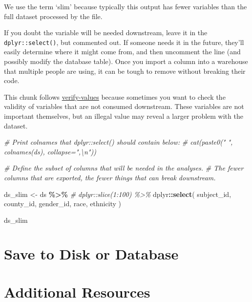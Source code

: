 \documentclass[
]{book}
\newenvironment{Shaded}{\begin{snugshade}}{\end{snugshade}}
\newcommand{\CommentTok}[1]{\textcolor[rgb]{0.56,0.35,0.01}{\textit{#1}}}
\newcommand{\KeywordTok}[1]{\textcolor[rgb]{0.13,0.29,0.53}{\textbf{#1}}}
\newcommand{\NormalTok}[1]{#1}
\newcommand{\OperatorTok}[1]{\textcolor[rgb]{0.81,0.36,0.00}{\textbf{#1}}}
\newcommand{\StringTok}[1]{\textcolor[rgb]{0.31,0.60,0.02}{#1}}
\begin{document}
We use the term `slim' because typically this output has fewer variables than the full dataset processed by the file.

If you doubt the variable will be needed downstream, leave it in the \texttt{dplyr::select()}, but commented out. If someone needs it in the future, they'll easily determine where it might come from, and then uncomment the line (and possibly modify the database table). Once you import a column into a warehouse that multiple people are using, it can be tough to remove without breaking their code.

This chunk follows \protect\hyperlink{chunk-verify-values}{verify-values} because sometimes you want to check the validity of variables that are not consumed downstream. These variables are not important themselves, but an illegal value may reveal a larger problem with the dataset.

\begin{Shaded}
\begin{Highlighting}[]
\CommentTok{\# Print colnames that \textasciigrave{}dplyr::select()\textasciigrave{}  should contain below:}
\CommentTok{\#   cat(paste0("    ", colnames(ds), collapse=",\textbackslash{}n"))}

\CommentTok{\# Define the subset of columns that will be needed in the analyses.}
\CommentTok{\#   The fewer columns that are exported, the fewer things that can break downstream.}

\NormalTok{ds\_slim <{-}}
\StringTok{  }\NormalTok{ds }\OperatorTok{\%>\%}
\StringTok{  }\CommentTok{\# dplyr::slice(1:100) \%>\%}
\StringTok{  }\NormalTok{dplyr}\OperatorTok{::}\KeywordTok{select}\NormalTok{(}
\NormalTok{    subject\_id,}
\NormalTok{    county\_id,}
\NormalTok{    gender\_id,}
\NormalTok{    race,}
\NormalTok{    ethnicity}
\NormalTok{  )}

\NormalTok{ds\_slim}
\end{Highlighting}
\end{Shaded}

\hypertarget{save-to-disk-or-database}{%
\section{Save to Disk or Database}\label{save-to-disk-or-database}}

\hypertarget{additional-resources}{%
\section{Additional Resources}\label{additional-resources}}
\end{document}

